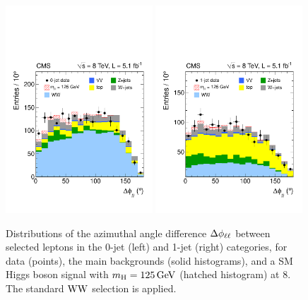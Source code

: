 \documentclass[12pt,twoside,a4paper,cmspaper,final,collab]{cms-tdr}
\begin{document}
\begin{figure}[h!t]
\begin{center}
   \includegraphics[width=0.49\textwidth]{figures/hww_wwpresel_0j_mh125_deltaphill.pdf}
   \includegraphics[width=0.49\textwidth]{figures/hww_wwpresel_1j_mh125_deltaphill.pdf}
	 \caption{Distributions of the azimuthal angle difference $\Delta\phi_{\ell\ell}$ between selected
leptons in the 0-jet (left) and 1-jet (right) categories, for data (points),
the main backgrounds (solid histograms), and a SM Higgs boson signal with $m_{\mathrm{H}}= 125\,\text{Ge\hspace{-.08em}V}$
(hatched histogram) at 8\TeV. The standard $\mathrm{W}\mathrm{W}$
selection is applied.} \label{fig:wwpresel_nj_mh125_deltaphill}
\end{center}
\end{figure}
\end{document}
